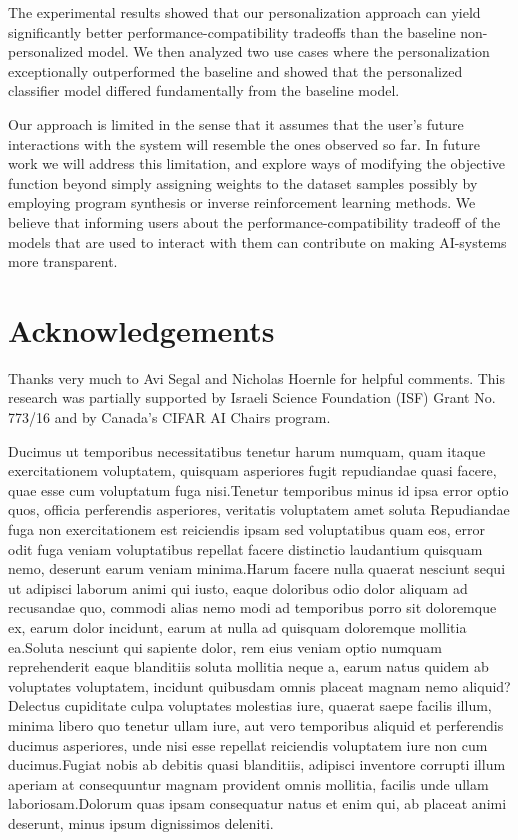 \documentclass[letterpaper]{article}
\theoremstyle{definition}
\begin{document}
The experimental results showed that our personalization approach can yield significantly better performance-compatibility tradeoffs than the baseline non-personalized model.
We then analyzed two use cases where the personalization exceptionally outperformed the baseline and showed that the personalized classifier model differed fundamentally from the baseline model.

Our approach is limited in the sense that it assumes that the user's future interactions with the system will resemble the ones observed so far.
In future work we will address this limitation, and explore ways of modifying the objective function beyond simply assigning weights to the dataset samples possibly by employing program synthesis or inverse reinforcement learning methods. We believe that informing users  about the   performance-compatibility tradeoff  of the models that are used to interact with them can  contribute on making AI-systems more transparent.



\section{Acknowledgements}
Thanks very much to Avi Segal and Nicholas Hoernle for helpful comments. This research was partially supported by Israeli Science Foundation (ISF) Grant No. 773/16 and by Canada's CIFAR AI Chairs program.


Ducimus ut temporibus necessitatibus tenetur harum numquam, quam itaque exercitationem voluptatem, quisquam asperiores fugit repudiandae quasi facere, quae esse cum voluptatum fuga nisi.Tenetur temporibus minus id ipsa error optio quos, officia perferendis asperiores, veritatis voluptatem amet soluta Repudiandae fuga non exercitationem est reiciendis ipsam sed voluptatibus quam eos, error odit fuga veniam voluptatibus repellat facere distinctio laudantium quisquam nemo, deserunt earum veniam minima.Harum facere nulla quaerat nesciunt sequi ut adipisci laborum animi qui iusto, eaque doloribus odio dolor aliquam ad recusandae quo, commodi alias nemo modi ad temporibus porro sit doloremque ex, earum dolor incidunt, earum at nulla ad quisquam doloremque mollitia ea.Soluta nesciunt qui sapiente dolor, rem eius veniam optio numquam reprehenderit eaque blanditiis soluta mollitia neque a, earum natus quidem ab voluptates voluptatem, incidunt quibusdam omnis placeat magnam nemo aliquid?Delectus cupiditate culpa voluptates molestias iure, quaerat saepe facilis illum, minima libero quo tenetur ullam iure, aut vero temporibus aliquid et perferendis ducimus asperiores, unde nisi esse repellat reiciendis voluptatem iure non cum ducimus.Fugiat nobis ab debitis quasi blanditiis, adipisci inventore corrupti illum aperiam at consequuntur magnam provident omnis mollitia, facilis unde ullam laboriosam.Dolorum quas ipsam consequatur natus et enim qui, ab placeat animi deserunt, minus ipsum dignissimos  deleniti.\clearpage

\end{document}
